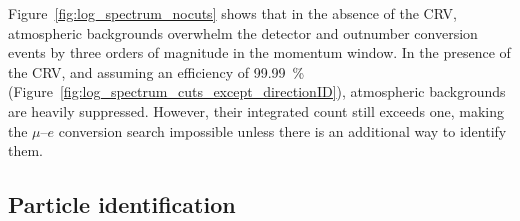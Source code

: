 Figure~\ref{fig:log_spectrum_nocuts} shows that in the absence of the CRV,
atmospheric backgrounds overwhelm the detector and outnumber conversion events
by three orders of magnitude in the momentum window. In the presence of the CRV,
and assuming an efficiency of \SI{99.99}{\percent}
(Figure~\ref{fig:log_spectrum_cuts_except_directionID}), atmospheric backgrounds
are heavily suppressed. However, their integrated count still exceeds one,
making the $\mu$--$e$ conversion search impossible unless there is an additional
way to identify them.








\subsection{Particle identification}



